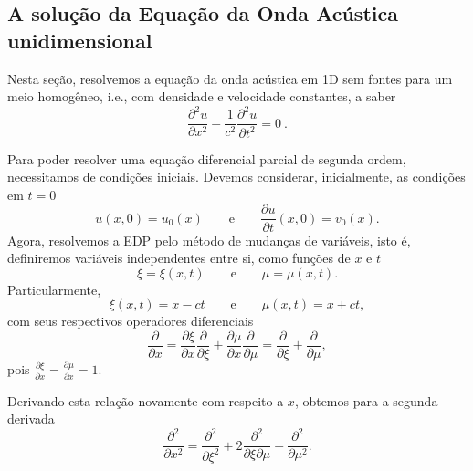 \subsection{A solu\c{c}\~ao da Equa\c{c}\~ao da Onda Ac\'ustica
unidimensional}

Nesta se\c{c}\~ao, resolvemos a equa\c{c}\~ao da onda ac\'ustica em 1D
sem fontes para um meio homog\^eneo, i.e., com densidade e velocidade
constantes, a saber
\begin{equation}
\frac{\partial^2 u}{\partial x^2} - \frac{1}{c^2}
\frac{\partial^2 u}{\partial t^2} = 0 \ .
\label{ondaacu1d}
\end{equation}

Para poder resolver uma equa\c{c}\~ao diferencial parcial de segunda
ordem, necessitamos de condi\c{c}\~oes iniciais.
Devemos considerar, inicialmente, as condi\c{c}\~oes em $t=0$
\begin{equation}
u(x,0)=u_0 (x) \qquad \mbox{e}\qquad  \frac{\partial u}{\partial t}(x,0)=v_0 (x).
\end{equation}
Agora, resolvemos a EDP pelo m\'etodo de mudan\c{c}as de vari\'aveis,
isto \'e, definiremos vari\'aveis independentes entre si, como
fun\c{c}\~oes de $x$ e $t$
\begin{equation}
 \xi =\xi (x,t) \qquad\mbox{e}\qquad \mu =\mu (x,t).
\end{equation}
Particularmente,
\begin{equation}
 \xi (x,t)=x-ct \qquad\mbox{e}\qquad \mu (x,t)=x+ct,
\end{equation}
com seus respectivos operadores diferenciais
\begin{equation}
 \frac{\partial}{\partial x}=\frac{\partial \xi}{\partial x}\frac{\partial}{\partial  \xi}+
\frac{\partial \mu}{\partial x}\frac{\partial}{\partial \mu}=\frac{\partial}{\partial  \xi}+
\frac{\partial}{\partial \mu},
\end{equation}
pois $\frac{\partial \xi}{\partial x}=\frac{\partial \mu}{\partial x}=1$.

Derivando esta rela\c{c}\~ao novamente com respeito a $x$, obtemos para
a segunda derivada
\begin{equation}\label{opx}
 \frac{\partial ^2}{\partial x^2}=\frac{\partial ^2}{\partial \xi ^2}+2\frac{\partial  ^2}
{\partial \xi \partial \mu}+\frac{\partial ^2}{\partial \mu ^2}.
\end{equation}

